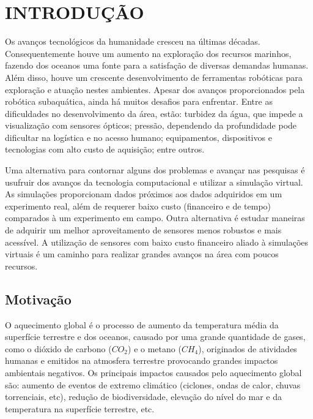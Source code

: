 
\chapter{INTRODUÇÃO}
\label{chap:introducao}

Os avanços tecnológicos da humanidade cresceu na últimas décadas. 
Consequentemente houve um aumento na exploração dos recursos marinhos, fazendo dos oceanos uma fonte para a satisfação de diversas demandas humanas.
Além disso, houve um crescente desenvolvimento de ferramentas robóticas para exploração e atuação nestes ambientes.
Apesar dos avanços proporcionados pela robótica subaquática, ainda há muitos desafios para enfrentar. 
Entre as dificuldades no desenvolvimento da área, estão: turbidez da água, que impede a visualização com sensores ópticos; pressão, dependendo da profundidade pode dificultar na logística e no acesso humano; equipamentos, dispositivos e tecnologias com alto custo de aquisição; entre outros. 

Uma alternativa para contornar alguns dos problemas e avançar nas pesquisas é usufruir dos avanços da tecnologia computacional e utilizar a simulação virtual.
As simulações proporcionam dados próximos aos dados adquiridos em um experimento real, além de requerer baixo custo (financeiro e de tempo) comparados à um experimento em campo. 
Outra alternativa é estudar maneiras de adquirir um melhor aproveitamento de sensores menos robustos e mais acessível.
A utilização de sensores com baixo custo financeiro aliado à simulações virtuais é um caminho para realizar grandes avanços na área com poucos recursos.

\section{Motivação}
\label{sec:motivacao}

O aquecimento global é o processo de aumento da temperatura média da superfície terrestre e dos oceanos, causado por uma grande quantidade de gases, como o dióxido de carbono ($CO_2$) e o metano ($CH_4$), originados de atividades humanas e emitidos na atmosfera terrestre provocando grandes impactos ambientais negativos. Os principais impactos causados pelo aquecimento global são: aumento de eventos de extremo climático (ciclones, ondas de calor, chuvas torrenciais, etc), redução de biodiversidade, elevação do nível do mar e da temperatura na superfície terrestre, etc. 

